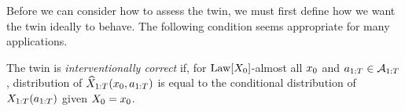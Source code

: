 Before we can consider how to assess the twin, we must first define how we want the twin ideally to behave.
The following condition seems appropriate for many applications.



\begin{definition}[Correctness] \label{eq:interventional-correctness}
    The twin is \emph{interventionally correct} if, for $\mathrm{Law}[X_0]$-almost all $x_0$ and $a_{1:T} \in \mathcal{A}_{1:T}$, distribution of $\widehat{X}_{1:T}(x_0, {a}_{1:T})$ is equal to the conditional distribution of $X_{1:T}(a_{1:T})$ given $X_0 = x_0$.
\end{definition}


